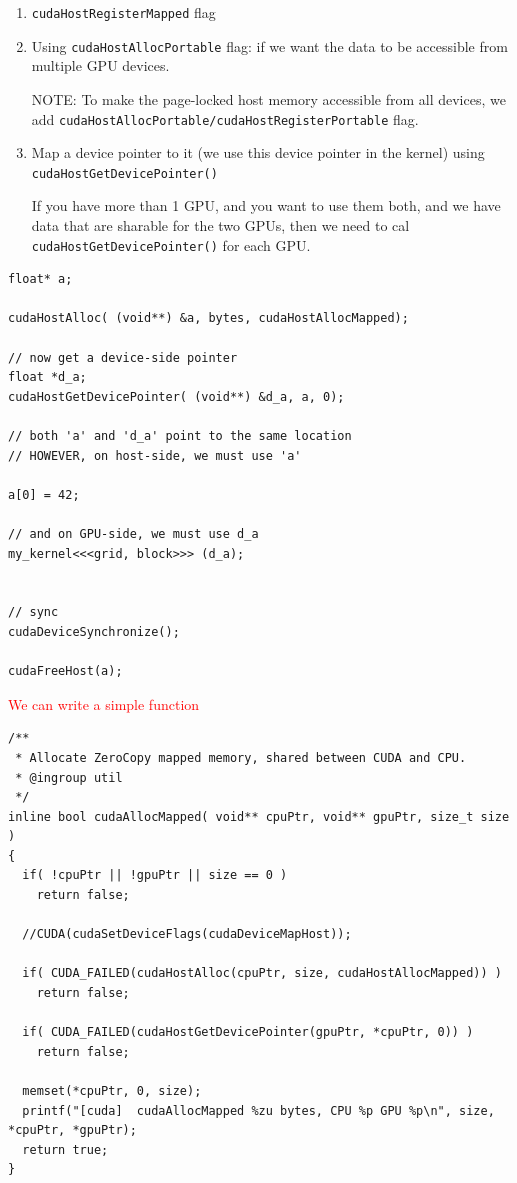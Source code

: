 \begin{enumerate}
  \item \verb!cudaHostRegisterMapped! flag
  
  \item Using \verb!cudaHostAllocPortable! flag:
  if we want the data to be accessible from multiple GPU devices.
  
  
  NOTE: To make the page-locked host memory accessible from all devices, we add
  \verb!cudaHostAllocPortable/cudaHostRegisterPortable! flag.

 
  \item Map a device pointer to it (we use this device pointer in the kernel)
  using \verb!cudaHostGetDevicePointer()!
  
  If you have more than 1 GPU, and you want to use them both, and we have data
  that are sharable for the two GPUs, then we need to cal
  \verb!cudaHostGetDevicePointer()! for each GPU.
  
\end{enumerate}

\begin{verbatim}
float* a;

cudaHostAlloc( (void**) &a, bytes, cudaHostAllocMapped);

// now get a device-side pointer
float *d_a;
cudaHostGetDevicePointer( (void**) &d_a, a, 0);

// both 'a' and 'd_a' point to the same location
// HOWEVER, on host-side, we must use 'a'

a[0] = 42;

// and on GPU-side, we must use d_a
my_kernel<<<grid, block>>> (d_a);


// sync
cudaDeviceSynchronize();

cudaFreeHost(a);
\end{verbatim}

\textcolor{red}{We can write a simple function} 
\begin{lstlisting} 
/**
 * Allocate ZeroCopy mapped memory, shared between CUDA and CPU.
 * @ingroup util
 */
inline bool cudaAllocMapped( void** cpuPtr, void** gpuPtr, size_t size )
{
  if( !cpuPtr || !gpuPtr || size == 0 )
    return false;

  //CUDA(cudaSetDeviceFlags(cudaDeviceMapHost));

  if( CUDA_FAILED(cudaHostAlloc(cpuPtr, size, cudaHostAllocMapped)) )
    return false;

  if( CUDA_FAILED(cudaHostGetDevicePointer(gpuPtr, *cpuPtr, 0)) )
    return false;

  memset(*cpuPtr, 0, size);
  printf("[cuda]  cudaAllocMapped %zu bytes, CPU %p GPU %p\n", size, *cpuPtr, *gpuPtr);
  return true;
}
\end{lstlisting}

